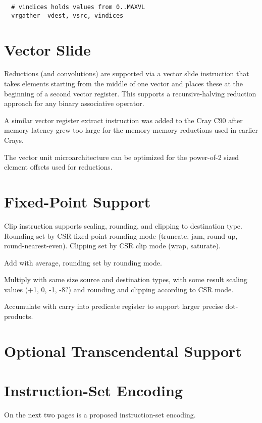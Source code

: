 \begin{verbatim}
  # vindices holds values from 0..MAXVL
  vrgather  vdest, vsrc, vindices
\end{verbatim}

\section{Vector Slide}

Reductions (and convolutions) are supported via a vector slide
instruction that takes elements starting from the middle of one vector
and places these at the beginning of a second vector register.  This
supports a recursive-halving reduction approach for any binary
associative operator.

\begin{commentary}
  A similar vector register extract instruction was added to the Cray
  C90 after memory latency grew too large for the memory-memory
  reductions used in earlier Crays.

  The vector unit microarchitecture can be optimized for the
  power-of-2 sized element offsets used for reductions.
\end{commentary}


\section{Fixed-Point Support}

Clip instruction supports scaling, rounding, and clipping to
destination type.  Rounding set by CSR fixed-point rounding mode
(truncate, jam, round-up, round-nearest-even).  Clipping set by CSR
clip mode (wrap, saturate).

Add with average, rounding set by rounding mode.

Multiply with same size source and destination types, with some result
scaling values (+1, 0, -1, -8?) and rounding and clipping according to
CSR mode.

Accumulate with carry into predicate register to support larger
precise dot-products.

\section{Optional Transcendental Support}

\section{Instruction-Set Encoding}


On the next two pages is a proposed instruction-set encoding.


